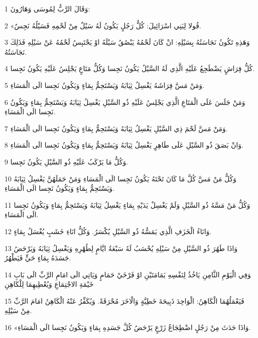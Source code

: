 \par 1 وَقَالَ الرَّبُّ لِمُوسَى وَهَارُونَ:
\par 2 «قُولا لِبَنِي اسْرَائِيلَ: كُلُّ رَجُلٍ يَكُونُ لَهُ سَيْلٌ مِنْ لَحْمِهِ فَسَيْلُهُ نَجِسٌ.
\par 3 وَهَذِهِ تَكُونُ نَجَاسَتُهُ بِسَيْلِهِ: انْ كَانَ لَحْمُهُ يَبْصُقُ سَيْلَهُ اوْ يَحْتَبِسُ لَحْمُهُ عَنْ سَيْلِهِ فَذَلِكَ نَجَاسَتُهُ.
\par 4 كُلُّ فِرَاشٍ يَضْطَجِعُ عَلَيْهِ الَّذِي لَهُ السَّيْلُ يَكُونُ نَجِسا وَكُلُّ مَتَاعٍ يَجْلِسُ عَلَيْهِ يَكُونُ نَجِسا.
\par 5 وَمَنْ مَسَّ فِرَاشَهُ يَغْسِلُ ثِيَابَهُ وَيَسْتَحِمُّ بِمَاءٍ وَيَكُونُ نَجِسا الَى الْمَسَاءِ.
\par 6 وَمَنْ جَلَسَ عَلَى الْمَتَاعِ الَّذِي يَجْلِسُ عَلَيْهِ ذُو السَّيْلِ يَغْسِلُ ثِيَابَهُ وَيَسْتَحِمُّ بِمَاءٍ وَيَكُونُ نَجِسا الَى الْمَسَاءِ.
\par 7 وَمَنْ مَسَّ لَحْمَ ذِي السَّيْلِ يَغْسِلُ ثِيَابَهُ وَيَسْتَحِمُّ بِمَاءٍ وَيَكُونُ نَجِسا الَى الْمَسَاءِ.
\par 8 وَانْ بَصَقَ ذُو السَّيْلِ عَلَى طَاهِرٍ يَغْسِلُ ثِيَابَهُ وَيَسْتَحِمُّ بِمَاءٍ وَيَكُونُ نَجِسا الَى الْمَسَاءِ.
\par 9 وَكُلُّ مَا يَرْكَبُ عَلَيْهِ ذُو السَّيْلِ يَكُونُ نَجِسا.
\par 10 وَكُلُّ مَنْ مَسَّ كُلَّ مَا كَانَ تَحْتَهُ يَكُونُ نَجِسا الَى الْمَسَاءِ وَمَنْ حَمَلَهُنَّ يَغْسِلُ ثِيَابَهُ وَيَسْتَحِمُّ بِمَاءٍ وَيَكُونُ نَجِسا الَى الْمَسَاءِ.
\par 11 وَكُلُّ مَنْ مَسَّهُ ذُو السَّيْلِ وَلَمْ يَغْسِلْ يَدَيْهِ بِمَاءٍ يَغْسِلُ ثِيَابَهُ وَيَسْتَحِمُّ بِمَاءٍ وَيَكُونُ نَجِسا الَى الْمَسَاءِ.
\par 12 وَانَاءُ الْخَزَفِ الَّذِي يَمَسُّهُ ذُو السَّيْلِ يُكْسَرُ. وَكُلُّ انَاءِ خَشَبٍ يُغْسَلُ بِمَاءٍ.
\par 13 وَاذَا طَهُرَ ذُو السَّيْلِ مِنْ سَيْلِهِ يُحْسَبُ لَهُ سَبْعَةُ ايَّامٍ لِطُهْرِهِ وَيَغْسِلُ ثِيَابَهُ وَيَرْحَضُ جَسَدَهُ بِمَاءٍ حَيٍّ فَيَطْهُرُ.
\par 14 وَفِي الْيَوْمِ الثَّامِنِ يَاخُذُ لِنَفْسِهِ يَمَامَتَيْنِ اوْ فَرْخَيْ حَمَامٍ وَيَاتِي الَى امَامِ الرَّبِّ الَى بَابِ خَيْمَةِ الاجْتِمَاعِ وَيُعْطِيهِمَا لِلْكَاهِنِ
\par 15 فَيَعْمَلُهُمَا الْكَاهِنُ: الْوَاحِدَ ذَبِيحَةَ خَطِيَّةٍ وَالْاخَرَ مُحْرَقَةً. وَيُكَفِّرُ عَنْهُ الْكَاهِنُ امَامَ الرَّبِّ مِنْ سَيْلِهِ.
\par 16 «وَاذَا حَدَثَ مِنْ رَجُلٍ اضْطِجَاعُ زَرْعٍ يَرْحَضُ كُلَّ جَسَدِهِ بِمَاءٍ وَيَكُونُ نَجِسا الَى الْمَسَاءِ.
